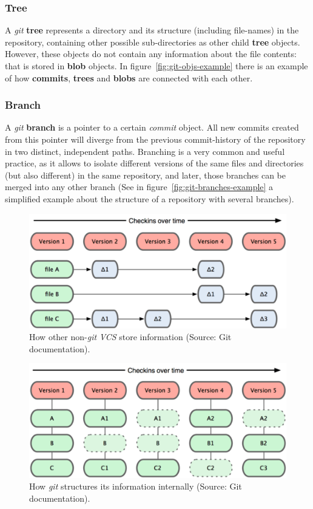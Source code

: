 \documentclass[a4paper, 12pt]{book}
\begin{document}
\subsubsection{Tree}
A \emph{git} \textbf{tree} represents a directory and its structure (including file-names) in the repository, containing other possible
sub-directories as other child \textbf{tree} objects. However, these objects do not contain any information about the file contents:
that is stored in \textbf{blob} objects. In figure~\ref{fig:git-objs-example} there is an example of how \textbf{commits},
\textbf{trees} and \textbf{blobs} are connected with each other.
\subsubsection{Branch}
A \emph{git} \textbf{branch} is a pointer to a certain \emph{commit} object. All new commits
created from this pointer will diverge from the previous commit-history of the repository in two distinct, independent paths.
Branching is a very common and useful practice, as it allows to isolate different versions of the same files and directories
(but also different) in the same repository, and later, those branches can be merged into any other branch (See in
figure~\ref{fig:git-branches-example} a simplified example about the structure of a repository with several branches).
\begin{figure}
  \centering
  \includegraphics[width=12cm, keepaspectratio]{img/deltas-not-git}
  \caption{How other non-\emph{git} \emph{VCS} store information (Source: Git documentation).}
  \label{fig:info-not-git}
\end{figure}
\begin{figure}
  \centering
  \includegraphics[width=12cm, keepaspectratio]{img/snapshots-git}
  \caption{How \emph{git} structures its information internally (Source: Git documentation).}
  \label{fig:info-git}
\end{figure}
\end{document}
